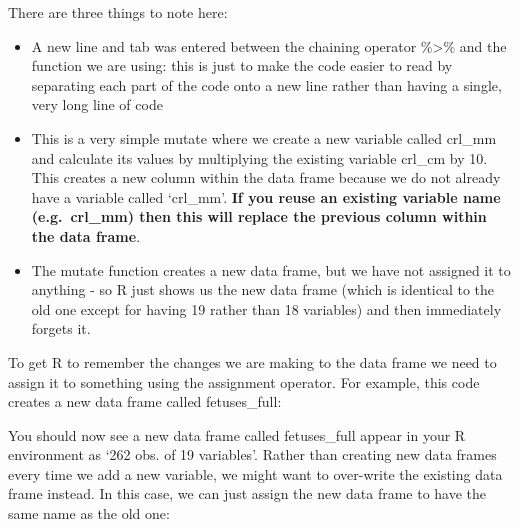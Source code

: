 \documentclass[
]{article}
\newenvironment{Shaded}{\begin{snugshade}}{\end{snugshade}}
\newcommand{\DataTypeTok}[1]{\textcolor[rgb]{0.13,0.29,0.53}{#1}}
\newcommand{\DecValTok}[1]{\textcolor[rgb]{0.00,0.00,0.81}{#1}}
\newcommand{\KeywordTok}[1]{\textcolor[rgb]{0.13,0.29,0.53}{\textbf{#1}}}
\newcommand{\NormalTok}[1]{#1}
\newcommand{\OperatorTok}[1]{\textcolor[rgb]{0.81,0.36,0.00}{\textbf{#1}}}
\newcommand{\StringTok}[1]{\textcolor[rgb]{0.31,0.60,0.02}{#1}}
\begin{document}
There are three things to note here:

\begin{itemize}
\item
  A new line and tab was entered between the chaining operator
  \%\textgreater\% and the function we are using: this is just to make
  the code easier to read by separating each part of the code onto a new
  line rather than having a single, very long line of code
\item
  This is a very simple mutate where we create a new variable called
  crl\_mm and calculate its values by multiplying the existing variable
  crl\_cm by 10. This creates a new column within the data frame because
  we do not already have a variable called `crl\_mm'. \textbf{If you
  reuse an existing variable name (e.g.~crl\_mm) then this will replace
  the previous column within the data frame}.
\item
  The mutate function creates a new data frame, but we have not assigned
  it to anything - so R just shows us the new data frame (which is
  identical to the old one except for having 19 rather than 18
  variables) and then immediately forgets it.
\end{itemize}

To get R to remember the changes we are making to the data frame we need
to assign it to something using the assignment operator. For example,
this code creates a new data frame called fetuses\_full:

\begin{Shaded}
\end{Shaded}

You should now see a new data frame called fetuses\_full appear in your
R environment as `262 obs. of 19 variables'. Rather than creating new
data frames every time we add a new variable, we might want to
over-write the existing data frame instead. In this case, we can just
assign the new data frame to have the same name as the old one:

\begin{Shaded}
\end{Shaded}
\end{document}
